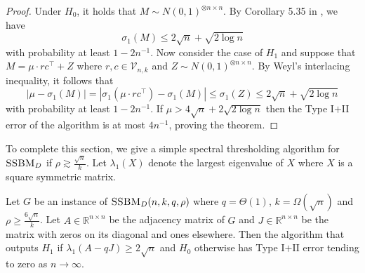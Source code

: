 \begin{proof}
Under $H_0$, it holds that $M \sim N(0, 1)^{\otimes n \times n}$. By Corollary 5.35 in \cite{vershynin2010introduction}, we have
$$\sigma_1(M) \le 2 \sqrt{n} + \sqrt{2\log n}$$
with probability at least $1 - 2n^{-1}$. Now consider the case of $H_1$ and suppose that $M = \mu \cdot rc^\top + Z$ where $r, c \in \mathcal{V}_{n, k}$ and $Z \sim N(0, 1)^{\otimes n \times n}$. By Weyl's interlacing inequality, it follows that
$$|\mu - \sigma_1(M)| = |\sigma_1(\mu \cdot rc^\top) - \sigma_1(M)| \le \sigma_1(Z) \le 2\sqrt{n} + \sqrt{2\log n}$$
with probability at least $1 - 2n^{-1}$. If $\mu > 4 \sqrt{n} + 2 \sqrt{2 \log n}$ then the Type I$+$II error of the algorithm is at most $4n^{-1}$, proving the theorem.
\end{proof}

To complete this section, we give a simple spectral thresholding algorithm for $\textsc{SSBM}_D$ if $\rho \gtrsim \frac{\sqrt{n}}{k}$. Let $\lambda_1(X)$ denote the largest eigenvalue of $X$ where $X$ is a square symmetric matrix. 

\begin{theorem}
Let $G$ be an instance of $\textsc{SSBM}_D(n, k, q, \rho)$ where $q = \Theta(1)$, $k = \Omega(\sqrt{n})$ and $\rho \ge \frac{6\sqrt{n}}{k}$. Let $A \in \mathbb{R}^{n \times n}$ be the adjacency matrix of $G$ and $J \in \mathbb{R}^{n \times n}$ be the matrix with zeros on its diagonal and ones elsewhere. Then the algorithm that outputs $H_1$ if $\lambda_1(A - qJ) \ge 2\sqrt{n}$ and $H_0$ otherwise has Type I$+$II error tending to zero as $n \to \infty$.
\end{theorem}

